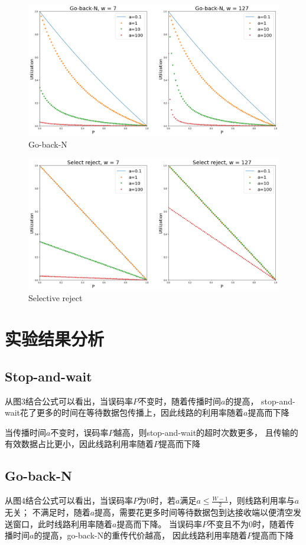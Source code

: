\documentclass[a4paper]{ctexart}
\begin{document}
    \begin{figure}[H]
      \includegraphics*[width=1\textwidth]{fig/gobackN.png}
      \caption{Go-back-N}
    \end{figure}
    \begin{figure}[H]
      \includegraphics*[width=1\textwidth]{fig/selectreject.png}
      \caption{Selective reject}
    \end{figure}

    \section{实验结果分析}
    \subsection*{Stop-and-wait}
    从图3结合公式可以看出，当误码率$P$不变时，随着传播时间$a$的提高，
    stop-and-wait花了更多的时间在等待数据包传播上，因此线路的利用率随着$a$提高而下降

    当传播时间$a$不变时，误码率$P$越高，则stop-and-wait的超时次数更多，
    且传输的有效数据占比更小，因此线路利用率随着$P$提高而下降
    \subsection*{Go-back-N}
    从图4结合公式可以看出，当误码率$P$为0时，若$a$满足$a\leq\frac{W-1}{2}$，则线路利用率与$a$无关；
    不满足时，随着$a$提高，需要花更多时间等待数据包到达接收端以便清空发送窗口，此时线路利用率随着$a$提高而下降。
    当误码率$P$不变且不为0时，随着传播时间$a$的提高，go-back-N的重传代价越高，
    因此线路利用率随着$P$提高而下降
\end{document}
